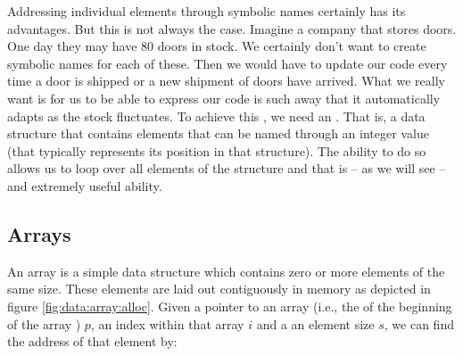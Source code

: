 Addressing individual elements through symbolic names certainly has its advantages. But this is not always the case. Imagine a company that stores doors. One day they may have 80 doors in stock. We certainly don't want to create symbolic names for each of these. Then we would have to update our code every time a door is shipped or a new shipment of doors have arrived. What we really want is for us to be able to express our code is such away that it automatically adapts as the stock fluctuates. To achieve this , we need an . That is, a data structure that contains elements that can be named through an integer value (that typically represents its position in that structure). The ability to do so allows us to loop over all elements of the structure and that is -- as we will see -- and extremely useful ability.

\subsection{Arrays}
\label{sec:data:array}

An array is a simple data structure which contains zero or more elements of the same size. These elements are laid out contiguously in memory as depicted in figure \ref{fig:data:array:alloc}. Given a pointer to an array (i.e., the  of the beginning of the array ) $p$, an index within that array $i$ and a an element size $s$, we can find the address of that element by:

